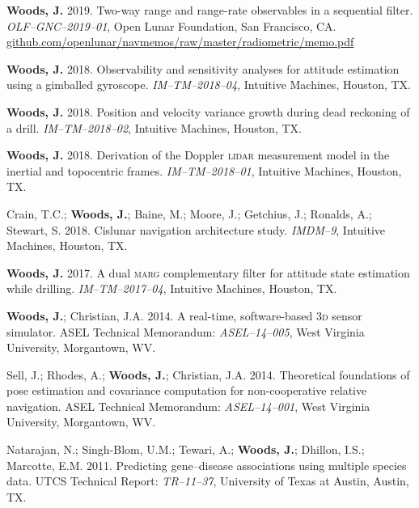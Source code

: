 \documentclass[12pt,letterpaper]{article}
\begin{document}
\medskip
\par\textbf{Woods, J.} 2019. Two-way range and range-rate observables in a sequential filter. \textit{OLF--GNC--2019--01}, Open Lunar Foundation, San Francisco, CA. \href{https://github.com/openlunar/navmemos/raw/master/radiometric/memo.pdf}{github.com/openlunar/navmemos/raw/master/radiometric/memo.pdf}

\medskip
\par\textbf{Woods, J.} 2018. Observability and sensitivity analyses for attitude estimation using a gimballed gyroscope. \textit{IM--TM--2018--04}, Intuitive Machines, Houston, TX.

\medskip
\par \textbf{Woods, J.} 2018. Position and velocity variance growth during dead reckoning of a drill. \textit{IM--TM--2018--02}, Intuitive Machines, Houston, TX.

\medskip
\par \textbf{Woods, J.} 2018. Derivation of the Doppler \textsc{lidar} measurement model in the inertial and topocentric frames. \textit{IM--TM--2018--01}, Intuitive Machines, Houston, TX.

\medskip
\par Crain, T.C.; \textbf{Woods, J.}; Baine, M.; Moore, J.; Getchius, J.; Ronalds, A.; Stewart, S. 2018. Cislunar navigation architecture study. \textit{IMDM--9}, Intuitive Machines, Houston, TX.

\medskip
\par \textbf{Woods, J.} 2017. A dual \textsc{marg} complementary filter for attitude state estimation while drilling. \textit{IM--TM--2017--04}, Intuitive Machines, Houston, TX.

\medskip
\par \textbf{Woods, J.}; Christian, J.A. 2014. A real-time, software-based \textsc{3d} sensor simulator. ASEL Technical Memorandum: \textit{ASEL--14--005}, West Virginia University, Morgantown, WV.

\medskip
\par Sell, J.; Rhodes, A.; \textbf{Woods, J.}; Christian, J.A. 2014. Theoretical foundations of pose estimation and covariance computation for non-cooperative relative navigation. ASEL Technical Memorandum: \textit{ASEL--14--001}, West Virginia University, Morgantown, WV.

\medskip
\par Natarajan, N.; Singh-Blom, U.M.; Tewari, A.; \textbf{Woods, J.}; Dhillon, I.S.; Marcotte, E.M. 2011. Predicting gene--disease associations using multiple species data. UTCS Technical Report: \textit{TR--11--37}, University of Texas at Austin, Austin, TX.
\end{document}
